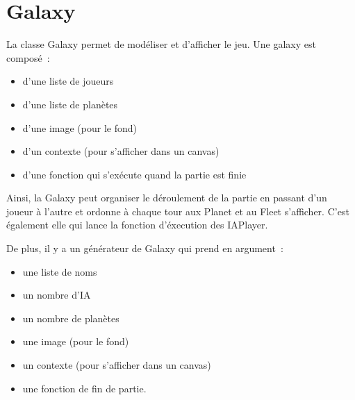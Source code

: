 \documentclass[a4paper]{report}
\begin{document}
\section*{Galaxy}

La classe Galaxy permet de modéliser et d'afficher le jeu. Une galaxy est composé :
\begin{itemize}
 \item d'une liste de joueurs
 \item d'une liste de planètes
 \item d'une image (pour le fond)
 \item d'un contexte (pour s'afficher dans un canvas)
 \item d'une fonction qui s’exécute quand la partie est finie
\end{itemize}
Ainsi, la Galaxy peut organiser le déroulement de la partie en passant d'un joueur à l'autre et ordonne à chaque tour aux Planet et au Fleet s'afficher.
C'est également elle qui lance la fonction d'éxecution des IAPlayer.

De plus, il y a un générateur de Galaxy qui prend en argument :
\begin{itemize}
 \item une liste de noms
 \item un nombre d’IA
 \item un nombre de planètes
 \item une image (pour le fond)
 \item un contexte (pour s'afficher dans un canvas)
 \item une fonction de fin de partie.
\end{itemize}
\end{document}
